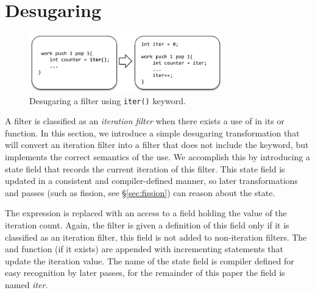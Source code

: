 \section{Desugaring}
\label{sec:desugar}

%
%
%
%
%
%
%
%
%
%


\begin{figure}[t!]
\centering
\includegraphics[width=3.3in]{figures/desugaring.pdf} 
\caption{Desugaring a filter using \texttt{iter()} keyword.\protect\label{fig:desugar}}
\end{figure}


A filter is classified as an {\it iteration filter} when there exists a use of
\iter in its \prework or \work function.  In this section, we
introduce a simple desugaring transformation that will convert an
iteration filter into a filter that does not include the \iter
keyword, but implements the correct semantics of the \iter use.  We
accomplish this by introducing a state field that records the current
iteration of this filter.  This state field is updated in a consistent
and compiler-defined manner, so later transformations and passes (such
as fission, see \S\ref{sec:fission}) can reason about the
state.  

The \iter expression is replaced with an access to a field holding the
value of the iteration count.  Again, the filter is given a definition
of this field only if it is classified as an iteration filter, this
field is not added to non-iteration filters.  The \work and \prework
function (if it exists) are appended with incrementing statements that
update the iteration value.  The name of the state field is compiler
defined for easy recognition by later passes, for the remainder of
this paper the field is named {\it iter}.


